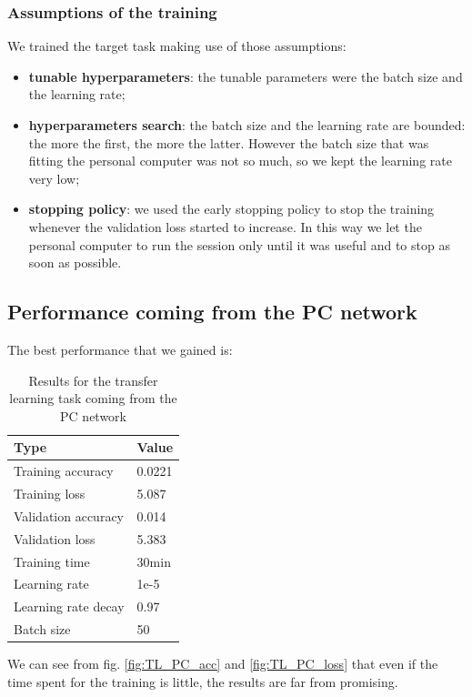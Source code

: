 \subsubsection{Assumptions of the training}\label{sss:TL_training}
We trained the target task making use of those assumptions:
\begin{itemize}
    \item \textbf{tunable hyperparameters}: the tunable parameters were the batch size and the learning rate;
    \item \textbf{hyperparameters search}: the batch size and the learning rate are bounded: the more the first, the more the latter. However the batch size that was fitting the personal computer was not so much, so we kept the learning rate very low;
    \item \textbf{stopping policy}: we used the early stopping policy to stop the training whenever the validation loss started to increase. In this way we let the personal computer to run the session only until it was useful and to stop as soon as possible.
\end{itemize}

\subsection{Performance coming from the PC network}
The best performance that we gained is:
\begin{table}[!ht]
    \begin{center}
        \label{tab:TL_PC_early_results}
        \begin{tabular}{l|l}
            \rowcolor{gray!50}
            \textbf{Type} & \textbf{Value} \\
            \hline
            Training accuracy & 0.0221\\
            Training loss & 5.087\\
            Validation accuracy & 0.014\\
            Validation loss & 5.383\\
            Training time & 30min\\
            Learning rate & 1e-5\\
            Learning rate decay & 0.97\\
            Batch size & 50\\
            \hline
        \end{tabular}
    \end{center}
    \caption{Results for the transfer learning task coming from the PC network}
\end{table}
We can see from fig. \ref{fig:TL_PC_acc} and \ref{fig:TL_PC_loss} that even if the time spent for the training is little, the results are far from promising.

